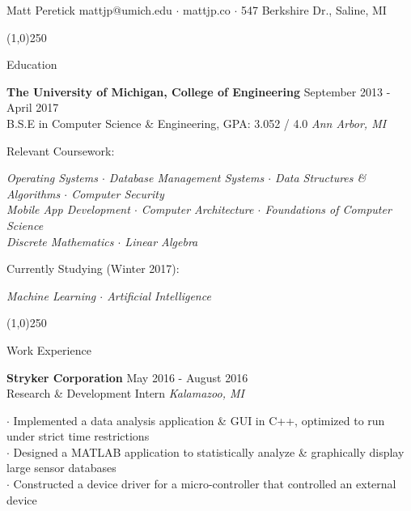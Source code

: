 \documentclass{article}
\begin{document}
{\fontsize{1cm}{1cm}\selectfont Matt Peretick} \hfill {\fontsize{0.5cm}{1cm}\selectfont mattjp@umich.edu $\cdot$ mattjp.co $\cdot$ 547 Berkshire Dr., Saline, MI}

\begin{center}
	\line(1,0){250}
\end{center}

{\huge Education}

\Large{\textbf{The University of Michigan, College of Engineering}}
\hfill
\large{September 2013 - April 2017}
\\
\large{B.S.E in Computer Science \& Engineering, GPA: 3.052 / 4.0}
\hfill
\large{\emph{Ann Arbor, MI}}

\large{Relevant Coursework:}

\begin{adjustwidth}{1cm}{}
	\begin{spacing}{.75}
		{\large \emph{Operating Systems $\cdot$ Database Management Systems $\cdot$ Data Structures \& 		Algorithms $\cdot$ Computer Security \\ Mobile App Development $\cdot$ Computer Architecture $			\cdot$ Foundations of Computer Science \\ Discrete Mathematics $\cdot$ Linear Algebra}}
	\end{spacing}
\end{adjustwidth}

\vspace*{-0.45cm}

\large{Currently Studying (Winter 2017):}

\begin{adjustwidth}{1cm}{}
	\begin{spacing}{.75}
		{\large \emph{Machine Learning $\cdot$ Artificial Intelligence}}
	\end{spacing}
\end{adjustwidth}

\vspace*{-0.7cm}

\begin{center}
	\line(1,0){250}
\end{center}

{\huge Work Experience}

\Large{\textbf{Stryker Corporation}}
\hfill
\large{May 2016 - August 2016}
\\
\large{Research \& Development Intern}
\hfill
\large{\emph{Kalamazoo, MI}}

\begin{adjustwidth}{1cm}{}
	\begin{spacing}{1}
		$\cdot$ Implemented a data analysis application \& GUI in C++, optimized to run under strict time restrictions \\ 
		$\cdot$ Designed a MATLAB application to statistically analyze \& graphically display large sensor databases \\ 
		$\cdot$ Constructed a device driver for a micro-controller that controlled an external device
	\end{spacing}
\end{adjustwidth}
\end{document}

